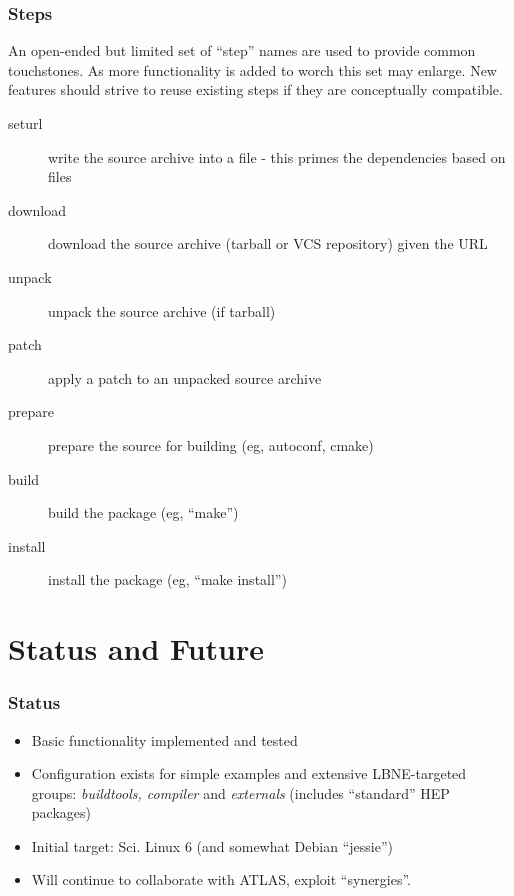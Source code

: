 \documentclass[xcolor=dvipsnames]{beamer}
\begin{document}
\begin{frame}
  \frametitle{Steps}

  An open-ended but limited set of ``step'' names are used to provide
  common touchstones.  As more functionality is added to worch this
  set may enlarge.  New features should strive to reuse existing steps
  if they are conceptually compatible.
  \begin{description}
  \item[seturl] write the source archive into a file - this primes the dependencies based on files
  \item[download] download the source archive (tarball or VCS repository) given the URL
  \item[unpack] unpack the source archive (if tarball)
  \item[patch] apply a patch to an unpacked source archive
  \item[prepare] prepare the source for building (eg, autoconf, cmake)
  \item[build] build the package (eg, ``make'')
  \item[install] install the package (eg, ``make install'')
  \end{description}

\end{frame}

\section{Status and Future}

\begin{frame}
\tableofcontents[
currentsection,currentsubsection,
hideothersubsections,sectionstyle=show/shaded,
] 
\end{frame}

\begin{frame}
  \frametitle{Status}
  \begin{itemize}
  \item Basic functionality implemented and tested
  \item Configuration exists for simple examples and extensive
    LBNE-targeted groups: \textit{buildtools, compiler} and
    \textit{externals} (includes ``standard'' HEP packages)
  \item Initial target: Sci. Linux 6 (and somewhat Debian ``jessie'')
  \item Will continue to collaborate with ATLAS, exploit ``synergies''.
  \end{itemize}
\end{frame}
\end{document}
